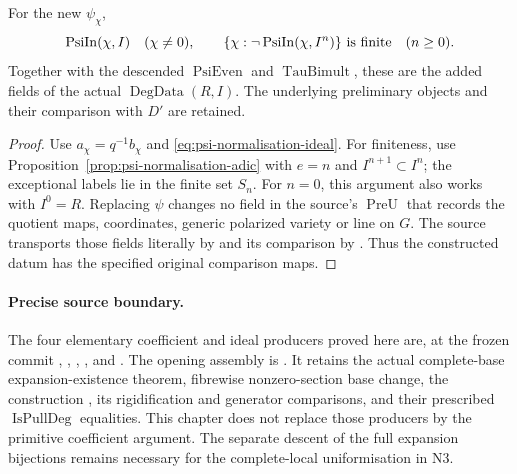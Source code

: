 \begin{srcorollary}
\label{cor:psi-normalisation-degdata}
For the new \(\psi_\chi\),
\[
 \operatorname{PsiIn}(\chi,I)\quad(\chi\ne0),\qquad
 \{\chi:\neg\operatorname{PsiIn}(\chi,I^n)\}\ \hbox{is finite}
                                      \quad(n\geq0).
\]
Together with the descended \(\operatorname{PsiEven}\)
and \(\operatorname{TauBimult}\), these are the added
fields of the actual \(\operatorname{DegData}(R,I)\).
The underlying preliminary objects and their
comparison with \(D'\) are retained.
\end{srcorollary}
\begin{proof}
Use \(a_\chi=q^{-1}b_\chi\) and
\eqref{eq:psi-normalisation-ideal}.
For finiteness, use Proposition~\ref{prop:psi-normalisation-adic}
with \(e=n\) and
\(I^{n+1}\subset I^n\); the exceptional labels lie in the
finite set \(S_n\).  For \(n=0\), this argument also works
with \(I^0=R\).
Replacing \(\psi\) changes no field in the source's
\(\operatorname{PreU}\) that records the quotient maps,
coordinates, generic polarized variety or line on \(G\).
The source transports those fields literally by
 and its comparison by
. Thus the constructed datum has the
specified original comparison maps.
\end{proof}

\paragraph{Precise source boundary.}
The four elementary coefficient and ideal producers
proved here are, at the frozen commit
,
,
,
, and
.
The opening assembly is
.
It retains the actual complete-base expansion-existence
theorem, fibrewise nonzero-section base change,
the construction , its rigidification
and generator comparisons, and their prescribed
\(\operatorname{IsPullDeg}\) equalities.
This chapter does not replace those producers by the
primitive coefficient argument. The separate descent
of the full expansion bijections remains necessary
for the complete-local uniformisation in N3.
